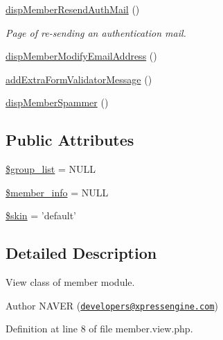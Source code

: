 \begin{DoxyCompactItemize}
\hyperlink{classmemberView_a6796539153aa0a8deda927e51ba302ed}{disp\-Member\-Resend\-Auth\-Mail} ()
\begin{DoxyCompactList}\small\item\em Page of re-\/sending an authentication mail. \end{DoxyCompactList}\item 
\hyperlink{classmemberView_ac89f9f6436c7d195835d091960f5d113}{disp\-Member\-Modify\-Email\-Address} ()
\item 
\hyperlink{classmemberView_a7500578f8585e5875626ea613763d22b}{add\-Extra\-Form\-Validator\-Message} ()
\item 
\hyperlink{classmemberView_a89f56007be451ba8c4136a2e25d343ec}{disp\-Member\-Spammer} ()
\end{DoxyCompactItemize}
\subsection*{Public Attributes}
\begin{DoxyCompactItemize}
\item 
\hyperlink{classmemberView_a8a34ae05d48f3e4471f073c7b6094a19}{\$group\-\_\-list} = N\-U\-L\-L
\item 
\hyperlink{classmemberView_a435c30d8223b51ac6b6a568142dc6c2e}{\$member\-\_\-info} = N\-U\-L\-L
\item 
\hyperlink{classmemberView_a01171d2b82e91a06754a9f8c52af6962}{\$skin} = 'default'
\end{DoxyCompactItemize}


\subsection{Detailed Description}
View class of member module. 

\begin{DoxyAuthor}{Author}
N\-A\-V\-E\-R (\href{mailto:developers@xpressengine.com}{\tt developers@xpressengine.\-com}) 
\end{DoxyAuthor}


Definition at line 8 of file member.\-view.\-php.



